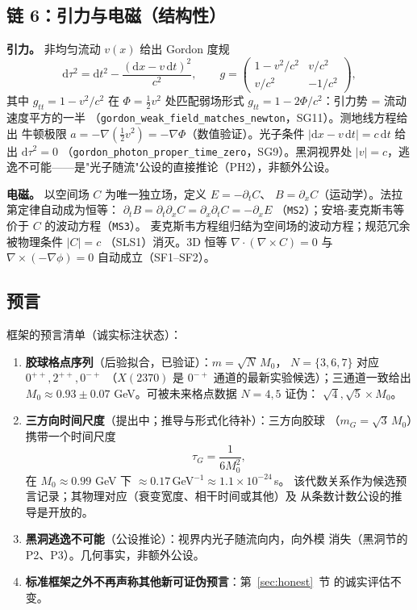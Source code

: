 \documentclass[aps,prd,preprint,superscriptaddress,amsmath,amssymb]{revtex4-2}
\begin{document}
\subsection{链 6：引力与电磁（结构性）}
\label{app:chain6}

\textbf{引力。} 非均匀流动 $v(x)$ 给出 Gordon 度规\cite{gordon1923lichtfortpflanzung}
\begin{equation}
\mathrm d\tau^2=\mathrm dt^2-\frac{(\mathrm dx-v\,\mathrm dt)^2}{c^2},
\qquad g=\begin{pmatrix}1-v^2/c^2 & v/c^2\\ v/c^2 & -1/c^2\end{pmatrix},
\label{eq:gordon}
\end{equation}
其中 $g_{tt}=1-v^2/c^2$ 在 $\Phi=\tfrac12 v^2$ 处匹配弱场形式
$g_{tt}=1-2\Phi/c^2$：引力势 = 流动速度平方的一半
（\texttt{gordon\_weak\_field\_matches\_newton}，SG11）。测地线方程给出
牛顿极限 $a=-\nabla(\tfrac12 v^2)=-\nabla\Phi$（数值验证）。光子条件
$|\mathrm dx-v\,\mathrm dt|=c\,\mathrm dt$ 给出 $\mathrm d\tau^2=0$
（\texttt{gordon\_photon\_proper\_time\_zero}，SG9）。黑洞视界处
$|v|=c$，逃逸不可能——是"光子随流"公设的直接推论（PH2），非额外公设。

\textbf{电磁。} 以空间场 $C$ 为唯一独立场，定义 $E=-\partial_t C$、
$B=\partial_x C$（运动学）。法拉第定律自动成为恒等：
$\partial_t B=\partial_t\partial_x C=\partial_x\partial_t C=-\partial_x E$
（\texttt{MS2}）；安培-麦克斯韦等价于 $C$ 的波动方程（\texttt{MS3}）。
麦克斯韦方程组归结为空间场的波动方程；规范冗余被物理条件 $|C|=c$
（SLS1）消灭。3D 恒等 $\nabla\cdot(\nabla\times C)=0$ 与
$\nabla\times(-\nabla\phi)=0$ 自动成立（SF1--SF2）。

\subsection{预言}
\label{app:predictions}

框架的预言清单（诚实标注状态）：

\begin{enumerate}
\item \textbf{胶球格点序列}（后验拟合，已验证）：$m=\sqrt N\,M_0$，
$N=\{3,6,7\}$ 对应 $0^{++},2^{++},0^{-+}$
\cite{morningstar1999glueball,chen2006glueball,navas2024review,besiii2026lightest}
（$X(2370)$ 是 $0^{-+}$ 通道的最新实验候选）；三通道一致给出
$M_0\approx0.93\pm0.07$ GeV。可被未来格点数据 $N=4,5$ 证伪：
$\sqrt4,\sqrt5\times M_0$。
\item \textbf{三方向时间尺度}（提出中；推导与形式化待补）：三方向胶球
（$m_G=\sqrt3\,M_0$）携带一个时间尺度
\begin{equation}
\tau_G=\frac{1}{6M_0^2},
\label{eq:taug}
\end{equation}
在 $M_0\approx0.99$ GeV 下 $\approx0.17$\,GeV${}^{-1}\approx1.1\times10^{-24}$\,s。
该代数关系作为候选预言记录；其物理对应（衰变宽度、相干时间或其他）及
从条数计数公设的推导是开放的。
\item \textbf{黑洞逃逸不可能}（公设推论）：视界内光子随流向内，向外模
消失（黑洞节的 P2、P3）。几何事实，非额外公设。
\item \textbf{标准框架之外不再声称其他新可证伪预言}：第~\ref{sec:honest}~节
的诚实评估不变。
\end{enumerate}
\end{document}
